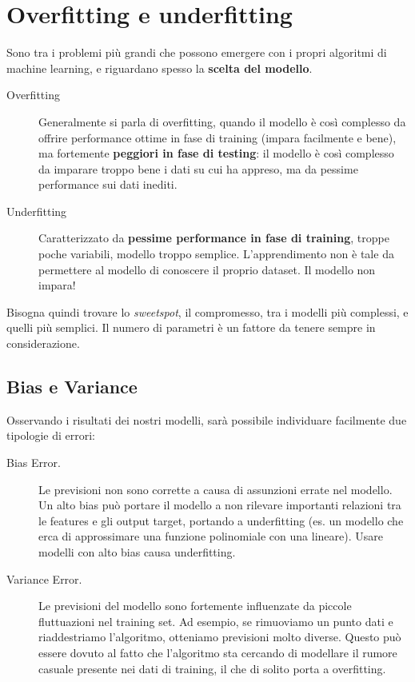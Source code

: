 \newpage

\section{Overfitting e underfitting}
Sono tra i problemi più grandi che possono emergere con i propri algoritmi di machine learning, e riguardano spesso la \textbf{scelta del modello}. 

\begin{description}
    \item[Overfitting] Generalmente si parla di overfitting, quando il modello è così complesso da offrire performance ottime in fase di training (impara facilmente e bene), ma fortemente \textbf{peggiori in fase di testing}: il modello è così complesso da imparare troppo bene i dati su cui ha appreso, ma da pessime performance sui dati inediti. 
    \item[Underfitting] Caratterizzato da \textbf{pessime performance in fase di training}, troppe poche variabili, modello troppo semplice. L'apprendimento non è tale da permettere al modello di conoscere il proprio dataset. Il modello non impara!
\end{description}

Bisogna quindi trovare lo \textit{sweetspot}, il compromesso, tra i modelli più complessi, e quelli più semplici. Il numero di parametri è un fattore da tenere sempre in considerazione. 

\subsection{Bias e Variance}

Osservando i risultati dei nostri modelli, sarà possibile individuare facilmente due tipologie di errori:

\begin{description}
    \item[Bias Error.] Le previsioni non sono corrette a causa di assunzioni errate nel modello. Un alto bias può portare il modello a non rilevare importanti relazioni tra le features e gli output target, portando a underfitting (es. un modello che erca di approssimare una funzione polinomiale con una lineare). Usare modelli con alto bias causa underfitting.
    \item[Variance Error.] Le previsioni del modello sono fortemente influenzate da piccole fluttuazioni nel training set. Ad esempio, se rimuoviamo un punto dati e riaddestriamo l'algoritmo, otteniamo previsioni molto diverse. Questo può essere dovuto al fatto che l'algoritmo sta cercando di modellare il rumore casuale presente nei dati di training, il che di solito porta a overfitting.
\end{description}

